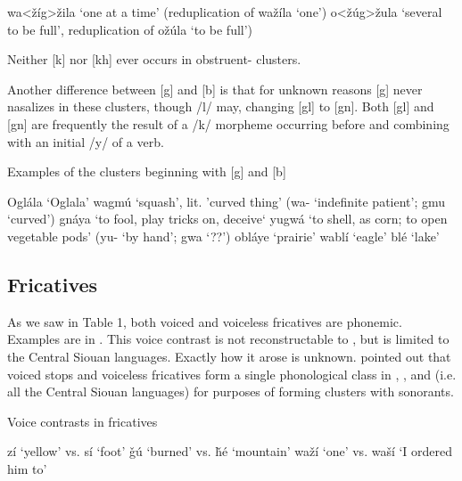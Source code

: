 \documentclass[output=paper]{LSP/langsci}
\begin{document}
\begin{exe}\label{ex:rood:2}
\ex
 \begin{xlist}
\ex wa<\v{z}\'ig>\v{z}ila `one at a time' (reduplication of wa\v{z}\'ila `one')
\ex o<\v{z}\'ug>\v{z}ula `several to be full', reduplication of o\v{z}\'ula `to be full')
\end{xlist}
\end{exe}

Neither [k] nor [kh] ever occurs in obstruent- clusters. 

Another difference between [g] and [b] is that for unknown reasons [g] never nasalizes in these clusters, though /l/ may, changing [gl] to [gn]. Both [gl] and [gn] are frequently the result of a /k/ morpheme occurring before and combining with an initial /y/ of a verb.

\begin{exe}\label{ex:rood:3}
\ex Examples of the clusters beginning with [g] and [b]
\begin{xlist}
\ex Ogl\'ala `Oglala'
\ex wagm\'u `squash', lit. 'curved thing' (wa- `indefinite patient'; gmu `curved')
\ex gn\'aya `to fool, play tricks on, deceive`
\ex yugw\'a `to shell, as corn; to open vegetable pods' (yu- `by hand'; gwa `??')
\ex obl\'aye `prairie'
\ex wabl\'i `eagle'
\ex bl\'e `lake'
\end{xlist}
\end{exe}

\subsection{Fricatives}

As we saw in Table 1, both voiced and voiceless fricatives are phonemic. Examples are in . This voice contrast is not reconstructable to , but is limited to the Central Siouan languages. Exactly how it arose is unknown. \citet{Miner1979a} pointed out that voiced stops and voiceless fricatives form a single phonological class in , ,  and  (i.e. all the Central Siouan languages) for purposes of forming clusters with sonorants.

\begin{exe}\label{ex:rood:4}
\ex Voice contrasts in  fricatives
\begin{xlist}
\ex z\'i `yellow' vs. s\'i `foot'
\ex \v{g}\'u `burned' vs. \v{h}\'e `mountain'
\ex wa\v{z}\'i `one' vs. wa\v{s}\'i `I ordered him to'
\end{xlist}
\end{exe}
\end{document}
